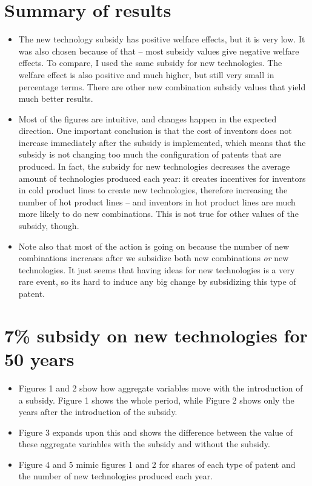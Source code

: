 \documentclass[a4paper,11pt]{article}
\begin{document}
\section*{Summary of results}

\begin{itemize}
\item The new technology subsidy has positive welfare effects, but it is very low. It was also chosen because of that -- most subsidy values give negative welfare effects. To compare, I used the same subsidy for new technologies. The welfare effect is also positive and much higher, but still very small in percentage terms. There are other new combination subsidy values that yield much better results.

\item Most of the figures are intuitive, and changes happen in the expected direction. One important conclusion is that the cost of inventors does not increase immediately after the subsidy is implemented, which means that the subsidy is not changing too much the configuration of patents that are produced. In fact, the subsidy for new technologies decreases the average amount of technologies produced each year: it creates incentives for inventors in cold product lines to create new technologies, therefore increasing the number of hot product lines -- and inventors in hot product lines are much more likely to do new combinations. This is not true for other values of the subsidy, though.

\item Note also that most of the action is going on because the number of new combinations increases after we subsidize both new combinations \textit{or} new technologies. It just seems that having ideas for new technologies is a very rare event, so its hard to induce any big change by subsidizing this type of patent.
\end{itemize}


\section*{7\% subsidy on new technologies for 50 years}

\begin{itemize}
\item Figures 1 and 2 show how aggregate variables move with the introduction of a subsidy. Figure 1 shows the whole period, while Figure 2 shows only the years after the introduction of the subsidy.
\item Figure 3 expands upon this and shows the difference between the value of these aggregate variables with the subsidy and without the subsidy.
\item Figure 4 and 5 mimic figures 1 and 2 for shares of each type of patent and the number of new technologies produced each year.
\end{itemize}
\end{document}
